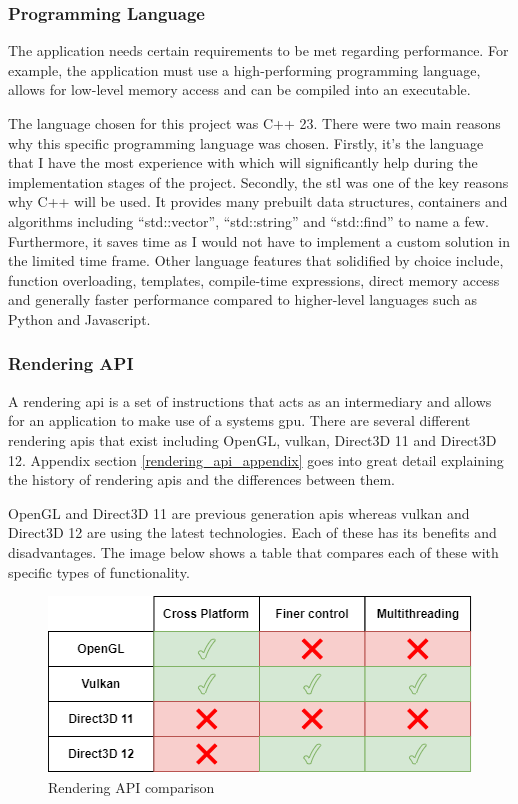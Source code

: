 \documentclass[11pt]{article}
\begin{document}
\subsubsection{Programming Language}
The application needs certain requirements to be met regarding performance. For
example, the application must use a high-performing programming language, allows
for low-level memory access and can be compiled into an executable.

The language chosen for this project was C++ 23.  There were two main reasons
why this specific programming language was chosen. Firstly, it's the language
that I have the most experience with which will significantly help during the
implementation stages of the project. Secondly, the \gls{stl}  was one of the
key reasons why C++ will be used. It provides many prebuilt data structures,
containers and algorithms including ``std::vector'', ``std::string'' and
``std::find'' to name a few. Furthermore, it saves time as I would not have to
implement a custom solution in the limited time frame. Other language features
that solidified by choice include, function overloading, templates, compile-time
expressions, direct memory access and generally faster performance compared to
higher-level languages such as Python and Javascript.

\subsubsection{Rendering API} \label{rendering_api}
A rendering \gls{api} is a set of instructions that acts as an intermediary and
allows for an application to make use of a systems \gls{gpu}. There are several
different rendering \glspl{api} that exist including OpenGL, \gls{vulkan},
Direct3D 11 and Direct3D 12. Appendix section \ref{rendering_api_appendix} goes
into great detail explaining the history of rendering \glspl{api} and the
differences between them.

OpenGL and Direct3D 11 are previous generation \glspl{api} whereas \gls{vulkan}
and Direct3D 12 are using the latest technologies. Each of these has its
benefits and disadvantages. The image below shows a table that compares each of
these with specific types of functionality. 
\begin{figure}[h!]
  \centering
  \includegraphics[width=\textwidth]{images/api_comparison.png}
  \caption{Rendering API comparison}
  \label{fig:api_comparison}
\end{figure}
\end{document}
